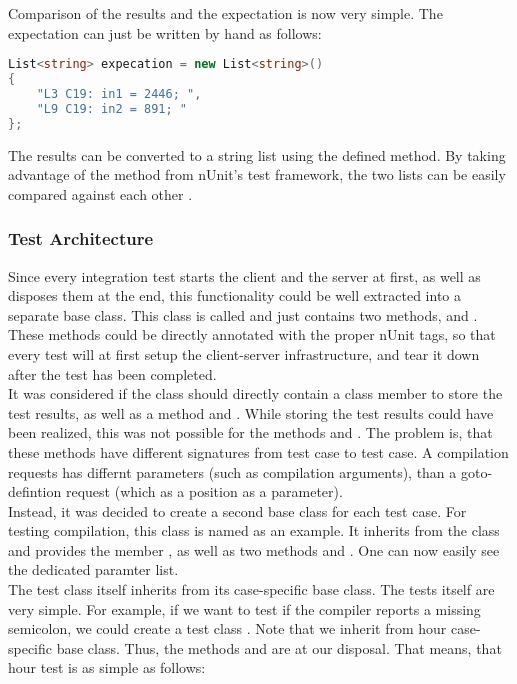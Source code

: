 {{Comparison of the results and the expectation is now very simple.
The expectation can just be written by hand as follows:

\begin{lstlisting}[language=csharp, caption={Expectation}, captionpos=b, label={lst:testexpectation}]
List<string> expecation = new List<string>()
{
    "L3 C19: in1 = 2446; ",
    "L9 C19: in2 = 891; "
};
\end{lstlisting}

The results can be converted to a string list using the defined  method.
By taking advantage of the method  from nUnit's test framework, the two lists can be easily compared against each other \cite{nunitCollectionAssert}.

\subsubsection{Test Architecture}
Since every integration test starts the client and the server at first, as well as disposes them at the end, this functionality could be well extracted into a separate base class.
This class is called  and just contains two methods,  and .
These methods could be directly annotated with the proper nUnit tags, so that every test will at first setup the client-server infrastructure, and tear it down after the test has been completed.\\
It was considered if the  class should directly contain a class member\linebreak {} to store the test results, as well as a method  and . While storing the test results could have been realized, this was not possible for the methods  and . The problem is, that these methods have different signatures from test case to test case. A compilation requests has differnt parameters (such as compilation arguments), than a goto-defintion request (which as a position as a parameter).\\
Instead, it was decided to create a second base class for each test case.
For testing compilation, this class is named  as an example.
It inherits from the  class and provides the member , as well as two methods  and . One can now easily see the dedicated paramter list.\\
The test class itself inherits from its case-specific base class.
The tests itself are very simple.
For example, if we want to test if the compiler reports a missing semicolon, we could create a test class .
Note that we inherit from hour case-specific base class.
Thus, the methods  and are at our disposal.
That means, that hour test is as simple as follows:

}}
